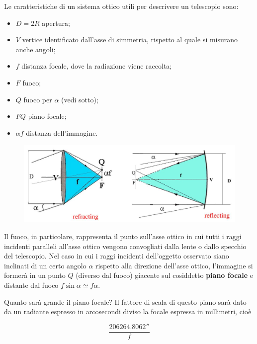 Le caratteristiche di un sistema ottico utili per descrivere un telescopio sono:

\begin{itemize}
    \item $D=2R$ apertura;
    \item $V$ vertice identificato dall'asse di simmetria, rispetto al quale si misurano anche angoli;
    \item $f$ distanza focale, dove la radiazione viene raccolta;
    \item $F$ fuoco;
    \item $Q$ fuoco per $\alpha$ (vedi sotto);
    \item $FQ$ piano focale;
    \item $\alpha f$ distanza dell'immagine.
\end{itemize}

\begin{figure}[H]
    \centering
    \includegraphics[width=12cm]{immagini/proprieta_telescopi_1.png}
\end{figure}



Il fuoco, in particolare, rappresenta il punto sull'asse ottico in cui tutti i raggi incidenti paralleli all'asse ottico vengono convogliati dalla lente o dallo specchio del telescopio. Nel caso in cui i raggi incidenti dell'oggetto osservato siano inclinati di un certo angolo $\alpha$ rispetto alla direzione dell'asse ottico, l'immagine si formerà in un punto $Q$ (diverso dal fuoco) giacente sul cosiddetto \textbf{piano focale} e distante dal fuoco $f \sin{\alpha} \simeq f\alpha$.

Quanto sarà grande il piano focale? Il fattore di scala di questo piano sarà dato da un radiante espresso in arcosecondi diviso la focale espressa in millimetri, cioè

\begin{equation*}
    \frac{206264.8062''}{f}
\end{equation*}

